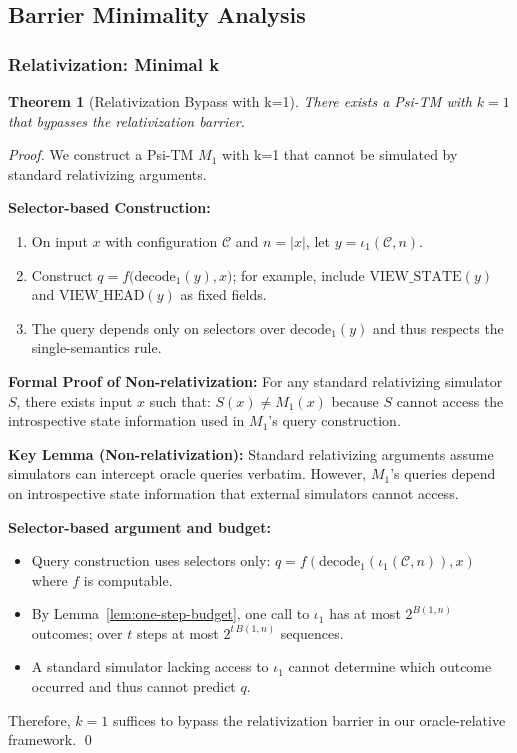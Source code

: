 \documentclass[11pt]{article}
\newtheorem{theorem}{Theorem}[section]
\theoremstyle{plain}
\theoremstyle{definition}
\newcommand{\len}[1]{\left|#1\right|}
\begin{document}
\subsection{Barrier Minimality Analysis}

\subsubsection{Relativization: Minimal k}

\begin{theorem}[Relativization Bypass with k=1]
\label{thm:relativization-k1}
There exists a Psi-TM with $k=1$ that bypasses the relativization barrier.
\end{theorem}

\begin{proof}
We construct a Psi-TM $M_1$ with k=1 that cannot be simulated by standard relativizing arguments.

\textbf{Selector-based Construction:}
\begin{enumerate}
\item On input $x$ with configuration $\mathcal{C}$ and $n=\len{x}$, let $y=\iota_1(\mathcal{C},n)$.
\item Construct $q = f\big(\mathrm{decode}_1(y), x\big)$; for example, include $\mathrm{VIEW\_STATE}(y)$ and $\mathrm{VIEW\_HEAD}(y)$ as fixed fields.
\item The query depends only on selectors over $\mathrm{decode}_1(y)$ and thus respects the single-semantics rule.
\end{enumerate}

\textbf{Formal Proof of Non-relativization:}
For any standard relativizing simulator $S$, there exists input $x$ such that:
$S(x) \neq M_1(x)$ because $S$ cannot access the introspective state information used in $M_1$'s query construction.

\textbf{Key Lemma (Non-relativization):} Standard relativizing arguments assume simulators can intercept oracle queries verbatim. However, $M_1$'s queries depend on introspective state information that external simulators cannot access.

\textbf{Selector-based argument and budget:}
\begin{itemize}
\item Query construction uses selectors only: $q = f(\mathrm{decode}_1(\iota_1(\mathcal{C},n)), x)$ where $f$ is computable.
\item By Lemma~\ref{lem:one-step-budget}, one call to $\iota_1$ has at most $2^{B(1,n)}$ outcomes; over $t$ steps at most $2^{t\,B(1,n)}$ sequences.
\item A standard simulator lacking access to $\iota_1$ cannot determine which outcome occurred and thus cannot predict $q$.
\end{itemize}

Therefore, $k=1$ suffices to bypass the relativization barrier in our oracle-relative framework. \qed
\end{proof}
\end{document}
